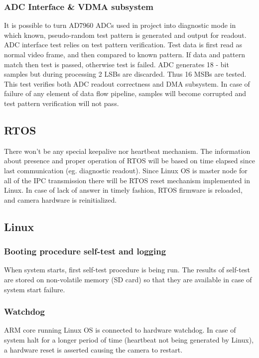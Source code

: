\subsubsection{ADC Interface \& VDMA subsystem}
It is possible to turn AD7960 ADCs used in project into diagnostic mode in which known, pseudo-random test pattern is generated and output for readout. ADC interface test relies on test pattern verification.
Test data is first read as normal video frame, and then compared to known pattern. If data and pattern match then test is passed, otherwise test is failed. ADC generates 18 - bit samples but during processing 2 LSBs are discarded. Thus 16 MSBs are tested. This test verifies both ADC readout correctness and DMA subsystem. In case of failure of any element of data flow pipeline, samples will become corrupted and test pattern verification will not pass.

\subsection{RTOS}
There won't be any special keepalive nor heartbeat mechanism. The information about presence and proper operation of RTOS will be based on time elapsed since last communication (eg. diagnostic readout). Since Linux OS is master node for all of the IPC transmission there will be RTOS reset mechanism implemented in Linux.  In case of lack of answer in timely fashion, RTOS firmware is reloaded, and camera hardware is reinitialized.

\subsection{Linux}
\subsubsection{Booting procedure self-test and logging}
When system starts, first self-test procedure is being run. The results of self-test are stored on non-volatile memory (SD card) so that they are available in case of system start failure.

\subsubsection{Watchdog}
ARM core running Linux OS is connected to hardware watchdog. In case of system halt for a longer period of time (heartbeat not being generated by Linux), a hardware reset is asserted causing the camera to restart.

